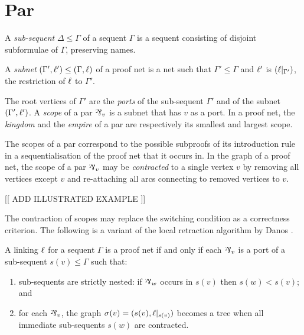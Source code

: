 
\section{Par}



\begin{definition}
A \emph{sub-sequent} $\Delta\leq\Gamma$ of a sequent $\Gamma$ is a sequent consisting of disjoint subformulae of $\Gamma$, preserving names.
\end{definition}


\begin{definition}
A \emph{subnet} $(\Gamma',\ell') \leq (\Gamma,\ell)$ of a proof net is a net such that $\Gamma'\leq\Gamma$ and $\ell'$ is $(\ell|_{\Gamma'})$, the restriction of $\ell$ to $\Gamma'$.
\end{definition}


The root vertices of $\Gamma'$ are the \emph{ports} of the sub-sequent $\Gamma'$ and of the subnet $(\Gamma',\ell')$.
%
A \emph{scope} of a par $\named v\parr$ is a subnet that has $v$ as a port.
%
In a proof net, the \emph{kingdom} and the \emph{empire} of a par are respectively its smallest and largest scope.



The scopes of a par correspond to the possible subproofs of its introduction rule in a sequentialisation of the proof net that it occurs in.
%
In the graph of a proof net, the scope of a par $\named v\parr$ may be \emph{contracted} to a single vertex $v$ by removing all vertices except $v$ and re-attaching all arcs connecting to removed vertices to $v$.
%

[[ ADD ILLUSTRATED EXAMPLE ]]

%
The contraction of scopes may replace the switching condition as a correctness criterion.
%
The following is a variant of the local retraction algorithm by Danos \cite{Danos-1990}.


\begin{proposition}
\label{prop:scoping correctness}
A linking $\ell$ for a sequent $\Gamma$ is a proof net if and only if each $\named v\parr$ is a port of a sub-sequent $s(v)\leq\Gamma$ such that:

\begin{enumerate}
	\item
sub-sequents are strictly nested: if $\named w\parr$ occurs in $s(v)$ then $s(w)<s(v)$; and
	\item
for each $\named v\parr$, the graph $\sigma(v)=(s(v),\ell|_{s(v)})$ becomes a tree when all immediate sub-sequents $s(w)$ are contracted.
\end{enumerate}

\end{proposition}


